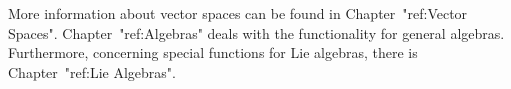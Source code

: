 
More information about vector spaces can be found in
Chapter~"ref:Vector Spaces".
Chapter~"ref:Algebras" deals with the functionality for general algebras.
Furthermore, concerning special functions for Lie algebras,
there is Chapter~"ref:Lie Algebras".



